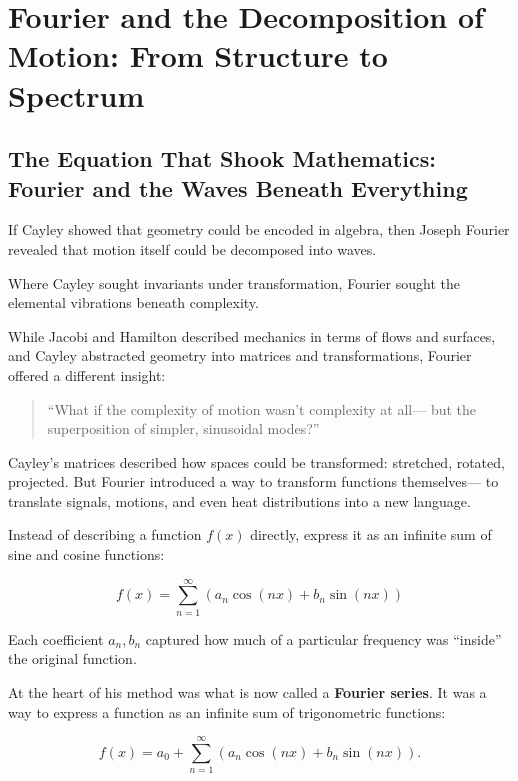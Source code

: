 \section{Fourier and the Decomposition of Motion: From Structure to Spectrum}

\subsection{The Equation That Shook Mathematics: Fourier and the Waves Beneath Everything}

If Cayley showed that geometry could be encoded in algebra,  
then Joseph Fourier revealed that motion itself could be decomposed into waves.

Where Cayley sought invariants under transformation,  
Fourier sought the elemental vibrations beneath complexity.

While Jacobi and Hamilton described mechanics in terms of flows and surfaces,  
and Cayley abstracted geometry into matrices and transformations,  
Fourier offered a different insight:

\begin{quote}
“What if the complexity of motion wasn’t complexity at all—  
but the superposition of simpler, sinusoidal modes?”
\end{quote}

Cayley’s matrices described how spaces could be transformed: stretched, rotated, projected.  
But Fourier introduced a way to transform functions themselves—  
to translate signals, motions, and even heat distributions into a new language.

Instead of describing a function \( f(x) \) directly,  express it as an infinite sum of sine and cosine functions:

\[
f(x) = \sum_{n=1}^{\infty} \left( a_n \cos(nx) + b_n \sin(nx) \right)
\]

Each coefficient \( a_n, b_n \) captured how much of a particular frequency was “inside” the original function.

At the heart of his method was what is now called a \textbf{Fourier series}. It was a way to express a function as an infinite sum of trigonometric functions:

\[
f(x) = a_0 + \sum_{n=1}^{\infty} \left( a_n \cos(n x) + b_n \sin(n x) \right).
\]

